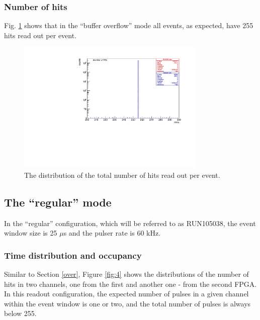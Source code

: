 \subsubsection{Number of hits}
Fig. \ref{fig:3} shows that in the ``buffer overflow'' mode all events,
as expected, have 255 hits read out per event.

\begin{figure}[!h]
\centering
\includegraphics[width =0.8\textwidth]{figures/pdf/figure_00008_nhits_281.pdf}
\caption{
  The distribution of the total number of hits read out per event.
}
\label{fig:3}
\end{figure}
\subsection{The ``regular'' mode }
In the ``regular'' configuration, which will be referred to as RUN105038, the event window size is 25 $\mu$s
and the pulser rate is 60 kHz.

\subsubsection{Time distribution and occupancy}

Similar to Section \ref{over}, Figure \ref{fig:4} shows the distributions
of the number of hits in two channels, one from the 
first and another one - from the second FPGA. 
In this readout configuration, the expected number of pulses in a given channel
within the event window is one or two, and the total number of pulses is always below 255.

